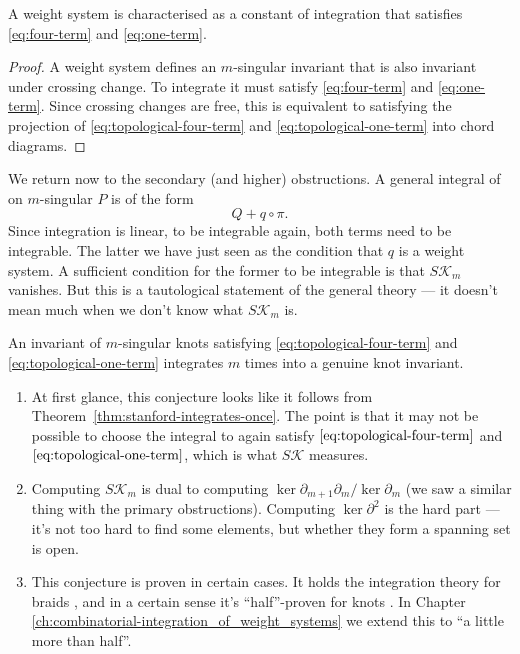 \begin{proposition}
	A weight system is characterised as a constant of integration that satisfies \textup{\ref{eq:four-term}} and \textup{\ref{eq:one-term}}.
\end{proposition}
\begin{proof}
	A weight system defines an \(m\)-singular invariant that is also invariant under crossing change. To integrate it must satisfy \ref{eq:four-term}  and \ref{eq:one-term}. Since crossing changes are free, this is equivalent to satisfying the projection of \ref{eq:topological-four-term} and \ref{eq:topological-one-term} into chord diagrams.
\end{proof}

We return now to the secondary (and higher) obstructions. A general integral of on \(m\)-singular \(P\) is of the form
\[Q + q \circ \pi.\]
Since integration is linear, to be integrable again, both terms need to be integrable. The latter we have just seen as the condition that \(q\) is a weight system. A sufficient condition for the former to be integrable is that \(S\mathcal{K}_{m}\) vanishes. But this is a tautological statement of the general theory --- it doesn't mean much when we don't know what \(S\mathcal{K}_{m}\) is.

\begin{conjecture}
	\label{conj:every-t4t-t1t-integrates}
	An invariant of \(m\)-singular knots satisfying \textup{\ref{eq:topological-four-term}} and \textup{\ref{eq:topological-one-term}} integrates \(m\) times into a genuine knot invariant.
\end{conjecture}

\begin{remarks}
	\begin{enumerate}
		\item At first glance, this conjecture looks like it follows from Theorem~\ref{thm:stanford-integrates-once}. The point is that it may not be possible to choose the integral to again satisfy \(\ref{eq:topological-four-term}\) and \(\ref{eq:topological-one-term}\), which is what \(S\mathcal{K}\) measures.
		\item Computing \(S\mathcal{K}_{m}\) is dual to computing \(\ker \partial_{m + 1} \partial_{m} / \ker \partial_{m}\) (we saw a similar thing with the primary obstructions). Computing \(\ker \partial^{2}\) is the hard part --- it's not too hard to find some elements, but whether they form a spanning set is open.
		\item This conjecture is proven in certain cases. It holds the integration theory for braids \cite{integration-of-singular-braid-invariants}, and in a certain sense it's ``half''-proven for knots \cite{a-combinatorial-half-integration-from-weight-system-to-vassiliev-knot-invariant}. In Chapter \ref{ch:combinatorial-integration_of_weight_systems} we extend this to ``a little more than half''.
	\end{enumerate}
\end{remarks}


